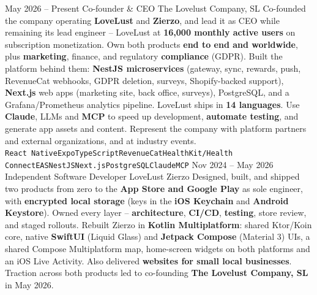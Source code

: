 \documentclass[9pt]{developercv} %
\begin{document}

\begin{entrylist}
	\entry
		{May 2026 -- Present}
		{Co-founder \& CEO}
		{The Lovelust Company, SL}
		{Co-founded the company operating \textbf{LoveLust} and \textbf{Zierzo}, and lead it as CEO while remaining its lead engineer -- LoveLust at \textbf{16,000 monthly active users} on subscription monetization. Own both products \textbf{end to end and worldwide}, plus \textbf{marketing}, finance, and regulatory \textbf{compliance} (GDPR). Built the platform behind them: \textbf{NestJS microservices} (gateway, sync, rewards, push, RevenueCat webhooks, GDPR deletion, surveys, Shopify-backed support), \textbf{Next.js} web apps (marketing site, back office, surveys), PostgreSQL, and a Grafana/Prometheus analytics pipeline. LoveLust ships in \textbf{14 languages}. Use \textbf{Claude}, LLMs and \textbf{MCP} to speed up development, \textbf{automate testing}, and generate app assets and content. Represent the company with platform partners and external organizations, and at industry events. \\
		\texttt{React Native}\slashsep\texttt{Expo}\slashsep\texttt{TypeScript}\slashsep\texttt{RevenueCat}\slashsep\texttt{HealthKit/Health Connect}\slashsep\texttt{EAS}\slashsep\texttt{NestJS}\slashsep\texttt{Next.js}\slashsep\texttt{PostgreSQL}\slashsep\texttt{Claude}\slashsep\texttt{MCP}}
	\entry
		{Nov 2024 -- May 2026}
		{Independent Software Developer}
		{LoveLust \slashsep Zierzo}
		{Designed, built, and shipped two products from zero to the \textbf{App Store and Google Play} as sole engineer, with \textbf{encrypted local storage} (keys in the \textbf{iOS Keychain} and \textbf{Android Keystore}). Owned every layer -- \textbf{architecture}, \textbf{CI/CD}, \textbf{testing}, store review, and staged rollouts. Rebuilt Zierzo in \textbf{Kotlin Multiplatform}: shared Ktor/Koin core, native \textbf{SwiftUI} (Liquid Glass) and \textbf{Jetpack Compose} (Material 3) UIs, a shared Compose Multiplatform map, home-screen widgets on both platforms and an iOS Live Activity. Also delivered \textbf{websites for small local businesses}. Traction across both products led to co-founding \textbf{The Lovelust Company, SL} in May 2026. \\
}
\end{entrylist}
\end{document}
